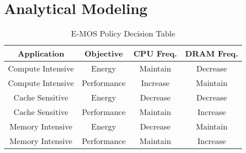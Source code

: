 \section{Analytical Modeling}\label{sec:analytic}




\begin{table}[h]
\footnotesize
\def\arraystretch{0.52}
\setlength{\tabcolsep}{.30em}
\center
\begin{tabular}{cccc} \toprule
Application & Objective & CPU Freq. & DRAM Freq.  \\ \midrule
Compute Intensive & Energy & Maintain & Decrease \\
Compute Intensive & Performance & Increase & Maintain \\
Cache Sensitive & Energy &  Decrease & Decrease \\ 
Cache Sensitive & Performance &  Maintain & Increase \\ 
Memory Intensive & Energy & Decrease & Maintain \\
Memory Intensive & Performance & Maintain & Increase \\ \midrule

\end{tabular}
\caption{E-MOS Policy Decision Table}\label{tbl:emos-dec}
\end{table}


